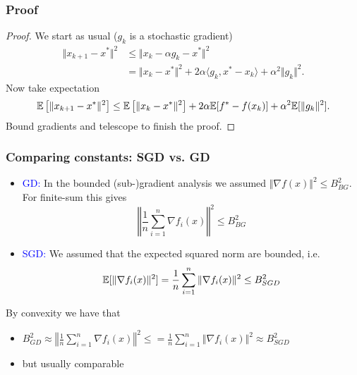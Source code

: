 \documentclass{beamer}
\begin{document}
\begin{frame}
  \frametitle{Proof}
  \begin{proof}

  We start as usual ($g_k$ is a stochastic gradient)
  \begin{equation}
    \begin{aligned}
      \Vert x_{k+1} - x^* \Vert^2 &\le \Vert x_k - \alpha g_k - x^* \Vert^2 \\
      &= \Vert x_k-x^* \Vert^2 + 2 \alpha \langle g_k, x^*-x_k \rangle + \alpha^2 \Vert g_k \Vert^2.
    \end{aligned}
  \end{equation}
  Now take expectation
  \begin{equation}
      \mathbb{E} \left[\Vert x_{k+1} - x^* \Vert^2\right] \le \mathbb{E} \left[\Vert x_k-x^* \Vert^2\right] + 2 \alpha \mathbb{E}[f^*- f(x_k)]+ \alpha^2 \mathbb{E}[\Vert g_k \Vert^2].
  \end{equation}
  Bound gradients and telescope to finish the proof.
  \end{proof}
\end{frame}

\begin{frame}
  \frametitle{Comparing constants: SGD vs. GD}
  \begin{itemize}
    \item \textcolor{blue}{GD:} In the bounded (sub-)gradient analysis we assumed $\Vert \nabla f(x) \Vert^2 \le B_{BG}^2$. For finite-sum this gives
          \begin{equation}
            \left\Vert \frac{1}{n}\sum_{i=1}^{n}\nabla f_i(x) \right\Vert^2 \le B_{BG}^2
          \end{equation}
    \item \textcolor{blue}{SGD:} We assumed that the expected squared norm are bounded, i.e.
          \begin{equation}
            \mathbb{E}[ \Vert \nabla f_i(x) \Vert^2 ] = \frac{1}{n} \sum_{i=1}^{n} \Vert \nabla f_i(x) \Vert^2 \le B_{SGD}^2
          \end{equation}
  \end{itemize}

  By convexity we have that
  \begin{itemize}
    \item $B_{GD}^2 \approx \left\Vert \frac{1}{n}\sum_{i=1}^{n}\nabla f_i(x) \right\Vert^2 \le = \frac{1}{n} \sum_{i=1}^{n} \Vert \nabla f_i(x) \Vert^2 \approx B_{SGD}^2$
    \item but usually comparable
  \end{itemize}
\end{frame}
\end{document}
